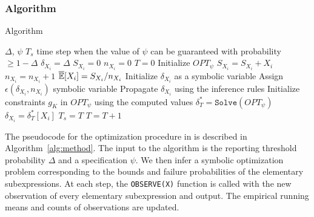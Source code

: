 \subsubsection{\AVOIRmethodname{} Algorithm}
\label{sec:implementation}
\begin{algorithm}
    \caption{\AVOIRmethodname{} Algorithm}
    \label{alg:method}
    \small
    \begin{algorithmic}[1] %
        \Require $\Delta$, $\psi$  
        \Ensure $T_s$ time step when the value of $\psi$ can be guaranteed with probability $ \geq 1 - \Delta$
            \State $\delta_{X_i} = \Delta$ 
            \State $S_{X_i} = 0$ 
            \State $n_{X_i} = 0$ 
        \EndFor
        \State $T = 0$ 
        \State Initialize $OPT_\psi$ 
                \State $S_{X_i} = S_{X_i} + X_i$
                \State $n_{X_i} = n_{X_i} + 1$
                \State $\overline{\mathbb{E}}[X_i] = S_{X_i}/n_{X_i}$
                \State Initialize $\delta_{X_i}$ as a symbolic variable
                \State Assign $\epsilon(\delta_{X_i}, n_{X_i})$ symbolic variable
            \EndFor
            \State Propagate $\delta_{X_i}$ using the inference rules
            \State Initialize constraints $g_K$ in $OPT_\psi$ using the computed values
            \State $\delta^*_T = \texttt{Solve}(OPT_\psi)$
                \State $\delta_{X_i} = \delta^*_T[X_i]$ 
                \State \Return $T_s = T$
            \EndIf
            \State $T = T + 1$
        \EndProcedure
    \end{algorithmic}
\end{algorithm}
The pseudocode for the optimization procedure in \AVOIRmethodname{} is described in Algorithm~\ref{alg:method}.
The input to the algorithm is the reporting threshold probability $\Delta$ and a specification $\psi$.
We then infer a symbolic optimization problem corresponding to the bounds and failure probabilities of the elementary subexpressions.
At each step, the \texttt{OBSERVE(X)} function is called with the new observation of every elementary subexpression and output.
The empirical running means and counts of observations are updated.
